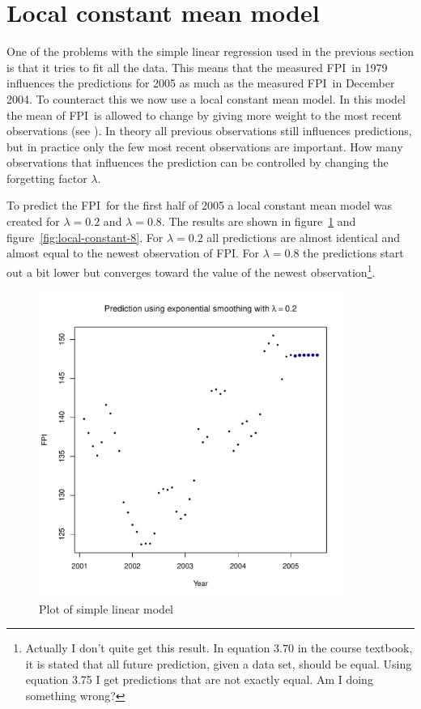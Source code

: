 \documentclass[11pt]{article}
\newcommand\fpi{FPI}
\begin{document}
\section*{Local constant mean model}
One of the problems with the simple linear regression used in the previous section is that it tries to fit all the data. This means that the measured \fpi\ in 1979 influences the predictions for 2005 as much as the measured \fpi\ in December 2004. To counteract this we now use a local constant mean model. In this model the mean of \fpi\ is allowed to change by giving more weight to the most recent observations (see \cite[p. 50]{hm}). In theory all previous observations still influences predictions, but in practice only the few most recent observations are important. How many observations that influences the prediction can be controlled by changing the forgetting factor $\lambda$. \par
To predict the \fpi\ for the first half of 2005 a local constant mean model was created for $\lambda=0.2$ and $\lambda=0.8$. The results are shown in figure~\ref{fig:local-constant-2} and figure~\ref{fig:local-constant-8}. For $\lambda=0.2$ all predictions are almost identical and almost equal to the newest observation of \fpi. For $\lambda=0.8$ the predictions start out a bit lower but converges toward the value of the newest observation\footnote{Actually I don't quite get this result. In equation $3.70$ in the course textbook, it is stated that all future prediction, given a data set, should be equal. Using equation 3.75 I get predictions that are not exactly equal. Am I doing something wrong?}.


\begin{figure}
    \centering
    \includegraphics[width=100mm]{exp-smoothing-lambda-2.pdf}
    \caption{Plot of simple linear model}
    \label{fig:local-constant-2}
\end{figure}
\end{document}
